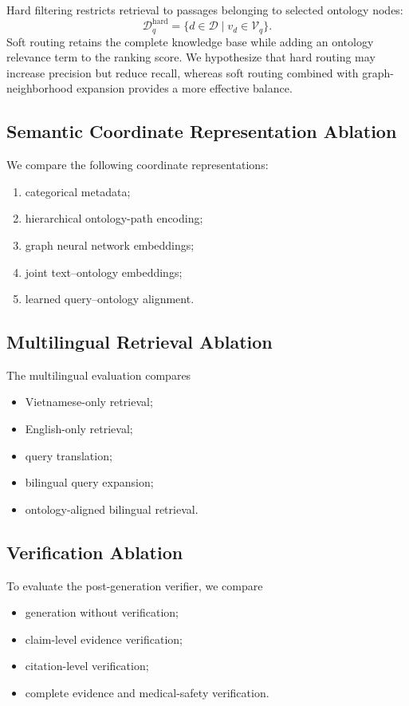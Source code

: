 \documentclass{article}
\begin{document}
Hard filtering restricts retrieval to passages belonging to selected ontology nodes:
\begin{equation}
    \mathcal{D}_q^{\mathrm{hard}}
    =
    \{
    d \in \mathcal{D}
    \mid
    v_d \in \mathcal{V}_q
    \}.
\end{equation}
Soft routing retains the complete knowledge base while adding an ontology relevance term to the ranking score. We hypothesize that hard routing may increase precision but reduce recall, whereas soft routing combined with graph-neighborhood expansion provides a more effective balance.

\subsection{Semantic Coordinate Representation Ablation}

We compare the following coordinate representations:
\begin{enumerate}
    \item categorical metadata;
    \item hierarchical ontology-path encoding;
    \item graph neural network embeddings;
    \item joint text--ontology embeddings;
    \item learned query--ontology alignment.
\end{enumerate}

\subsection{Multilingual Retrieval Ablation}

The multilingual evaluation compares
\begin{itemize}
    \item Vietnamese-only retrieval;
    \item English-only retrieval;
    \item query translation;
    \item bilingual query expansion;
    \item ontology-aligned bilingual retrieval.
\end{itemize}

\subsection{Verification Ablation}
To evaluate the post-generation verifier, we compare
\begin{itemize}
    \item generation without verification;
    \item claim-level evidence verification;
    \item citation-level verification;
    \item complete evidence and medical-safety verification.
\end{itemize}
\end{document}

